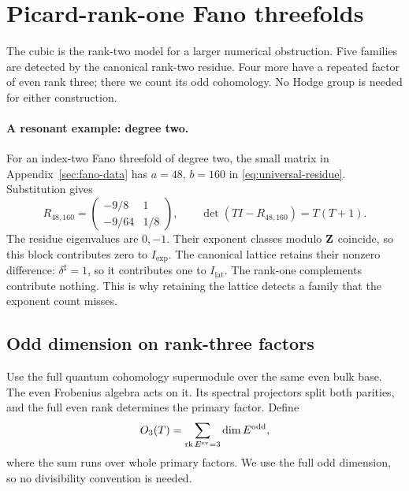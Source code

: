\section{Picard-rank-one Fano threefolds}
\label{sec:fano-classification}
The cubic is the rank-two model for a larger numerical obstruction.
Five families are detected by the canonical rank-two residue. Four more
have a repeated factor of even rank three; there we count its odd
cohomology. No Hodge group is needed for either construction.

\paragraph{A resonant example: degree two.}
For an index-two Fano threefold of degree two, the small matrix in
Appendix~\ref{sec:fano-data} has $a=48$, $b=160$ in
\eqref{eq:universal-residue}. Substitution gives
\[
 R_{48,160}=\begin{pmatrix}-9/8&1\\-9/64&1/8\end{pmatrix},
 \qquad \det(TI-R_{48,160})=T(T+1).
\]
The residue eigenvalues are $0,-1$. Their exponent classes modulo $\mathbf Z$
coincide, so this block contributes zero to $I_{\mathrm{exp}}$.
The canonical lattice retains their nonzero difference:
$\delta^\sharp=1$, so it contributes one to $I_{\mathrm{lat}}$.
The rank-one complements contribute nothing. This is why retaining the
lattice detects a family that the exponent count misses.

\subsection{Odd dimension on rank-three factors}
Use the full quantum cohomology supermodule over the same even bulk base.
The even Frobenius algebra acts on it. Its spectral projectors split both
parities, and the full even rank determines the primary factor.
Define
\[
 O_3(T)=\sum_{\operatorname{rk} E^{\mathrm{ev}}=3}\dim E^{\mathrm{odd}},
\]
where the sum runs over whole primary factors. We use the full odd dimension,
so no divisibility convention is needed.

